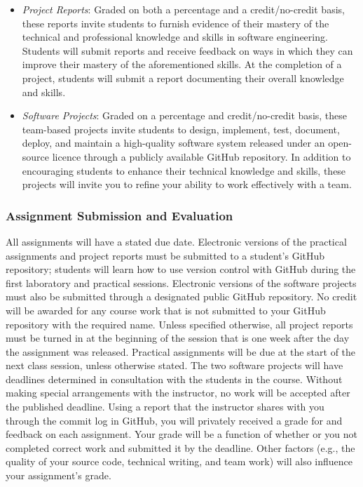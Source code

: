 \documentclass[11pt]{article}
\begin{document}
\begin{itemize}
  \item {\em Project Reports\/}: Graded on both a percentage and a
    credit/no-credit basis, these reports invite students to furnish evidence of
    their mastery of the technical and professional knowledge and skills in
    software engineering. Students will submit reports and receive feedback on
    ways in which they can improve their mastery of the aforementioned skills.
    At the completion of a project, students will submit a report documenting
    their overall knowledge and skills.

  \item {\em Software Projects\/}: Graded on a percentage and credit/no-credit
    basis, these team-based projects invite students to design, implement, test,
    document, deploy, and maintain a high-quality software system released under
    an open-source licence through a publicly available GitHub repository. In
    addition to encouraging students to enhance their technical knowledge and
    skills, these projects will invite you to refine your ability to work
    effectively with a team.

\end{itemize}

\subsubsection*{Assignment Submission and Evaluation}

All assignments will have a stated due date. Electronic versions of the
practical assignments and project reports must be submitted to a student's
GitHub repository; students will learn how to use version control with GitHub
during the first laboratory and practical sessions. Electronic versions of the
software projects must also be submitted through a designated public GitHub
repository. No credit will be awarded for any course work that is not submitted
to your GitHub repository with the required name.
%
Unless specified otherwise, all project reports must be turned in at the
beginning of the session that is one week after the day the assignment was
released. Practical assignments will be due at the start of the next class
session, unless otherwise stated. The two software projects will have deadlines
determined in consultation with the students in the course. Without making
special arrangements with the instructor, no work will be accepted after the
published deadline.
%
Using a report that the instructor shares with you through the commit log in
GitHub, you will privately received a grade for and feedback on each assignment.
Your grade will be a function of whether or you not completed correct work and
submitted it by the deadline. Other factors (e.g., the quality of your source
code, technical writing, and team work) will also influence your assignment's
grade.
\end{document}
